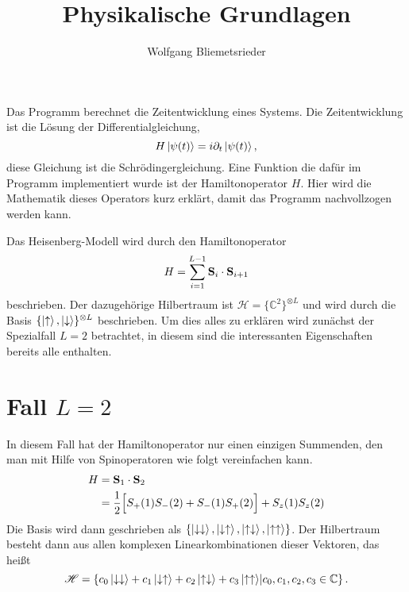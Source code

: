 \documentclass[11pt,a4paper]{scrartcl}
\title{Physikalische Grundlagen}
\author{Wolfgang Bliemetsrieder}
\date{}
\begin{document}
\maketitle
Das Programm  berechnet die Zeitentwicklung eines Systems. Die Zeitentwicklung ist die Lösung der Differentialgleichung,
\begin{equation*}
	H\ket{\psi (t)}=i\partial_t\ket{\psi (t)},
\end{equation*}
diese Gleichung ist die Schrödingergleichung. Eine Funktion die dafür im Programm implementiert wurde ist der Hamiltonoperator $H$. Hier wird die Mathematik dieses Operators kurz erklärt, damit das Programm nachvollzogen werden kann.

Das Heisenberg-Modell wird durch den Hamiltonoperator
\begin{equation*}
	H=\sum_{i=1}^{L-1}\vb{S}_i\cdot\vb{S}_{i+1}
\end{equation*}
beschrieben. Der dazugehörige Hilbertraum ist $\mathscr{H}=\{\mathbb{C}^2\}^{\otimes L}$ und wird durch die Basis $\{\ket{\uparrow},\ket{\downarrow}\}^{\otimes L}$ beschrieben. Um dies alles zu erklären wird zunächst der Spezialfall $L=2$ betrachtet, in diesem sind die interessanten Eigenschaften bereits alle enthalten.
\section{Fall $L=2$}
In diesem Fall hat der Hamiltonoperator nur einen einzigen Summenden, den man mit Hilfe von Spinoperatoren wie folgt vereinfachen kann.
\begin{align*}
	H&=\vb{S}_1\cdot\vb{S}_2\\%
	&=\frac{1}{2}\Big[S_+(1)S_-(2)+S_-(1)S_+(2)\Big]
	+S_z(1)S_z(2)
\end{align*}
Die Basis wird dann geschrieben als $\left\{\ket{\downarrow\downarrow},\ket{\downarrow\uparrow},\ket{\uparrow\downarrow},\ket{\uparrow\uparrow}\right\}$. Der Hilbertraum besteht dann aus allen komplexen Linearkombinationen dieser Vektoren, das heißt
\begin{equation*}
\mathscr{H}=\left\{c_0\ket{\downarrow\downarrow}+c_1\ket{\downarrow\uparrow}+c_2\ket{\uparrow\downarrow}+c_3\ket{\uparrow\uparrow}\middle|c_0,c_1,c_2,c_3\in\mathbb{C}\right\}.
\end{equation*}
\end{document}
